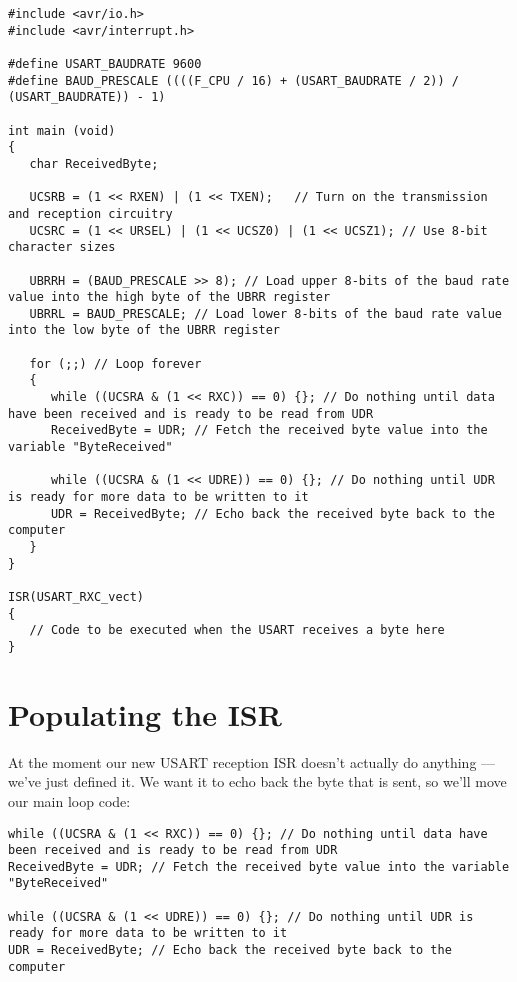 \documentclass[a4paper,oneside,notitlepage]{book}
\begin{document}
\begin{center}
\begin{lstlisting}
#include <avr/io.h>
#include <avr/interrupt.h>

#define USART_BAUDRATE 9600
#define BAUD_PRESCALE ((((F_CPU / 16) + (USART_BAUDRATE / 2)) / (USART_BAUDRATE)) - 1)

int main (void)
{
   char ReceivedByte;

   UCSRB = (1 << RXEN) | (1 << TXEN);   // Turn on the transmission and reception circuitry
   UCSRC = (1 << URSEL) | (1 << UCSZ0) | (1 << UCSZ1); // Use 8-bit character sizes

   UBRRH = (BAUD_PRESCALE >> 8); // Load upper 8-bits of the baud rate value into the high byte of the UBRR register
   UBRRL = BAUD_PRESCALE; // Load lower 8-bits of the baud rate value into the low byte of the UBRR register

   for (;;) // Loop forever
   {
      while ((UCSRA & (1 << RXC)) == 0) {}; // Do nothing until data have been received and is ready to be read from UDR
      ReceivedByte = UDR; // Fetch the received byte value into the variable "ByteReceived"

      while ((UCSRA & (1 << UDRE)) == 0) {}; // Do nothing until UDR is ready for more data to be written to it
      UDR = ReceivedByte; // Echo back the received byte back to the computer
   }
}

ISR(USART_RXC_vect)
{
   // Code to be executed when the USART receives a byte here
}
\end{lstlisting}
\end{center}


\chapter{Populating the ISR}

At the moment our new USART reception ISR doesn't actually do anything --- we've just defined it. We want it to echo back the byte that is sent, so we'll move our main loop code:

\begin{center}
\begin{lstlisting}
while ((UCSRA & (1 << RXC)) == 0) {}; // Do nothing until data have been received and is ready to be read from UDR
ReceivedByte = UDR; // Fetch the received byte value into the variable "ByteReceived"

while ((UCSRA & (1 << UDRE)) == 0) {}; // Do nothing until UDR is ready for more data to be written to it
UDR = ReceivedByte; // Echo back the received byte back to the computer
\end{lstlisting}
\end{center}
\end{document}
